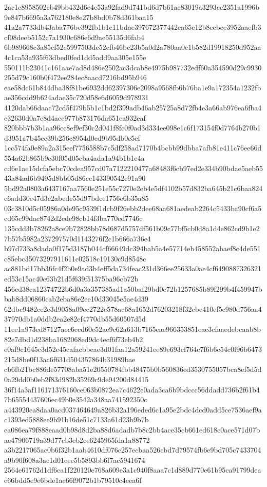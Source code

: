 \documentclass[11pt,a4paper]{article}
\begin{document}
{2ac1e8958502eb49bb432d6c4e53a92fad9d741bd6d7b61ae83019a3293cc2351a1996b9e847b6695a3a762180e8e27b8bd0b78d361baa15
41a2a7733db43aba776be392fb1b1c11bdae397672377442ea65c12b8ecbce3952aaefb3cf08deeb5152c7a1930c686e6d9ae55135d6fab4
6b989668c3a85cf52e5997503dc52efb46bc23b5a0d2a780aa0c1b582d19918250d952aa4c1ca53a935f63dbed0fed1dd5add9aa305e155e
550111b23041c161aae7ad8d486e2502ac3dcab8e4975b987732edf60a354590d29c9930255d79c160b0f472ee284ec8aacd7216bd95b946
eae58dc61b844dba38f81be6932dd62397306e2098a9568fb6b76ba1e9a172354a1232fbae356cdd9b624adae35c720d58e6d6059d978931
4120dab66daac72cd5f479b5b1c1bd2f399adb46ab25725a8d72fb4e3a66ab976ea6fba4c32630d0a7e8d4acc977b873176da651ea932eaf
820bbb7b3b1aa96cc8ef9ef30c2d041f8fc0f0ad3d334ee098e1c6f173154f0d7764b270b1d3951a7b45cc39b256c8954d0cd9b95db0e5ef
1cc574fa0e89a2a315eef7756588b7c5df258ad7170b4bcbb99dbba7afb81e411c76ee66d554a62b865b9c30f05d05eba4ada1a94b1b1e4a
cd6e1ae15dcfa5ebc70cdea957cd07a7122210477a68483f6cb97ed2e334b90bdae5aeb5543a84ad6b9495d8bb05d86cc143390542e91a90
5bd92a0803a6437167aa7560e251e55c7270e2eb4e5df4102b57d832ba645b21c6baa824c6add30e47d3e2abede55d97bdce1756e6b35a85
03c3810d5c05986a0de95c9539f1dcb9f26ebb2dee68aa681aedeab2264c5433ba90cf6a5cd65c99dac8742d2ede98cb14f3ba770ed7746c
135cdd3b78262a8ce9b72828bb78d687d5757df561b09c77bf5cb0d8a1d4e862cd9b1e27b57b5982a237297570d1143276f2c1b666a736e4
b97d733a8dada0f175d3187b044cf66649dc394bab5a4e57714eb458552abaef8c4de551c85ebc35073297911611c02518c19130c9d8548c
ac881bd17bb36fc4f2b0e9ad3b4eff5da734feac231d366ee25633a0ae4cf6490887326321ed53c15ac40c63b21d5f639f51375ba96cb72b
456ed38ca12374722b6d0a3a357385ad1a50baf29bd0e72b1257685b89f299b4f459947bbab8dd06860cab2eba86e2ee10d33045e5ae4d39
62dbc9482ce2e3d9058a09ec2722e578ac68a1652d76203218f32cbe410ef5e980d756aa437970db1a0ddb2ea2e82ef4770db55d60507d5d
11ce1a973ed87127aec6ccd60e52ae9c62a613b7165eae966353851eac3cfaaedebcaab8b82e7dbd1d238ba1682068ed9dc4ecf6f73eb4b2
e0af9c1645c3d52e45cafacbbeae3d01faa12a59241ee89e693cf764c7f6b6c54c0f96b6473215d8be0f13ac6f631d504357864b31989bae
cb6fb21bc886de57708aba51e20550784fbb48475b0b560836ed3530755057bca8ef5d5d0a29dd0b0eb2f83d982b35269c9de94200d84415
36f14a3af116171376160ce063b0872ea7c4622e0ada3ca6b9bdccc56ddadd736b2f61b47b65554437606ec49b0e3542a348aa741592350c
a443920ea8daa0acd037464649a826b32a196eded6c1a95e2bdc4dcd0add5ce7536aef9ac1393ed5888ee9b91b16de51c7133a61d23b9b7b
ea086ea79f888eaad0b98d8d2ba88d6adadb7b8c2bb4ace35cb661ed618c0ace571d07bae47906719a39d77cb3eb2ce6245965fda1a88772
a3b2217065ac0b6f32b1aab4610df076c257ecbaa526cbd7d79574fb6e9bd705c7433704a9b90f608a3ae1d01eee5b5893bb6f7ac5941674
2564e61762d1df6ca1f220120e768a609e3a1c940f8aaa7c1d889d770e61b95ca91799deae66bdd5e9e6bde1ae66f9072b1b79510c4eea6f
}
\end{document}
